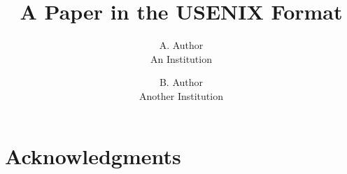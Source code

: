 \documentclass[letterpaper,twocolumn,10pt]{article}
\title{\Large\bf A Paper in the USENIX Format}
\author{
  {\rm A. Author}\\
  An Institution
  \and
  {\rm B. Author}\\
  Another Institution
}
\date{}
\begin{document}
\maketitle

\begin{abstract}

\end{abstract}





\section*{Acknowledgments}




\end{document}
